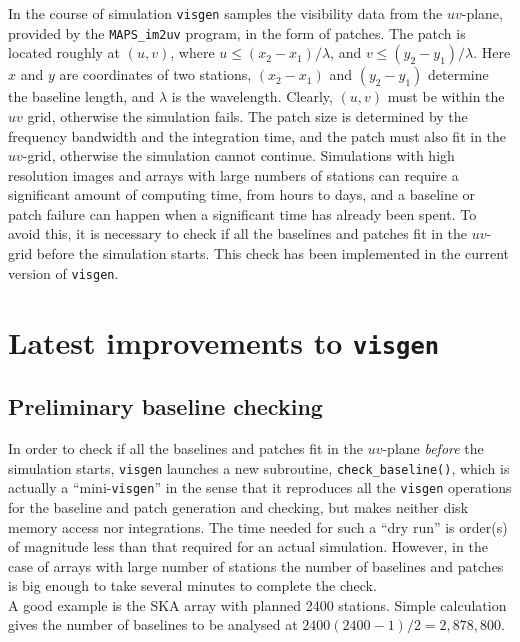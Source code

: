 \documentclass[letterpaper, oneside, 11pt]{article}
\begin{document}
In the course of simulation {\tt visgen} samples the visibility data from the $uv$-plane, provided by the {\tt MAPS\_im2uv} program, in the form of patches. The patch is located roughly at $(u,v)$, where $u \le (x_2 - x_1)/\lambda$, and  $v \le (y_2 - y_1)/\lambda$. Here $x$ and $y$ are coordinates of two stations, $(x_2 - x_1)$ and $(y_2 - y_1)$ determine the baseline length, and $\lambda$ is the wavelength. Clearly, $(u,v)$ must be within the $uv$ grid, otherwise the simulation fails. The patch size is determined by the frequency bandwidth and the integration time, and the patch must also fit in the $uv$-grid, otherwise the simulation cannot continue. Simulations with high resolution images and arrays with large numbers of stations can require a significant amount of computing time, from hours to days, and a baseline or patch failure can happen when a significant time has already been spent. To avoid this, it is necessary to check if all the baselines and patches fit in the $uv$-grid before the simulation starts. This check has been implemented in the current version of {\tt visgen}.


\section{Latest improvements to {\tt visgen}}

\subsection{Preliminary baseline checking}

In order to check if all the baselines and patches fit in the $uv$-plane \emph{before} the simulation starts, {\tt visgen} launches a new subroutine, {\tt check\_baseline()}, which is actually a ``mini-{\tt visgen}'' in the sense that it reproduces all the {\tt visgen} operations for the baseline and patch generation and checking, but makes neither disk memory access nor integrations. The time needed for such a ``dry run'' is order(s) of magnitude less than that required for an actual simulation. However, in the case of arrays with large number of stations the number of baselines and patches is big enough to take several minutes to complete the check. \\

A good example is the SKA array with planned 2400 stations. Simple calculation gives the number of baselines to be analysed at $2400(2400-1)/2 = 2,878,800$. \\
\end{document}
